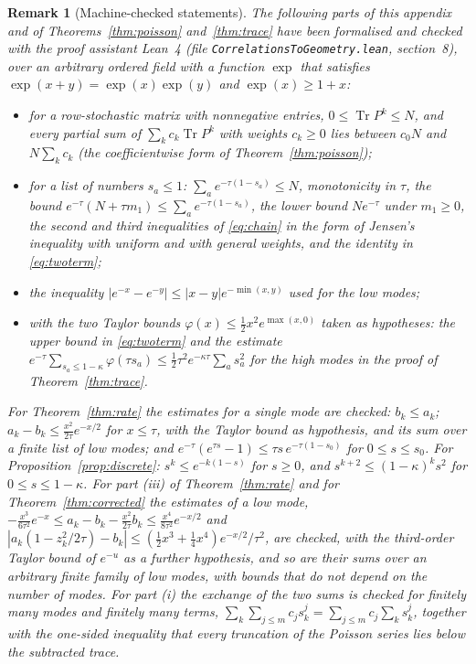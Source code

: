 \documentclass[11pt,a4paper]{article}
\theoremstyle{stmt}
\theoremstyle{defn}
\theoremstyle{rmk}
\newtheorem{remark}[theorem]{Remark}
\numberwithin{equation}{section}
\DeclareMathOperator{\Tr}{Tr}
\begin{document}
{\begin{remark}[Machine-checked statements]\label{rem:lean}
The following parts of this appendix and of Theorems~\ref{thm:poisson} and~\ref{thm:trace} have been formalised and checked with the proof assistant Lean~4 (file \texttt{CorrelationsToGeometry.lean}, section~8), over an arbitrary ordered field with a function $\exp$ that satisfies $\exp(x+y)=\exp(x)\exp(y)$ and $\exp(x)\ge1+x$:
\begin{itemize}
\item for a row-stochastic matrix with nonnegative entries, $0\le\Tr P^k\le N$, and every partial sum of $\sum_kc_k\Tr P^k$ with weights $c_k\ge0$ lies between $c_0N$ and $N\sum_kc_k$ (the coefficientwise form of Theorem~\ref{thm:poisson});
\item for a list of numbers $s_a\le1$: $\sum_ae^{-\tau(1-s_a)}\le N$, monotonicity in $\tau$, the bound $e^{-\tau}(N+\tau m_1)\le\sum_ae^{-\tau(1-s_a)}$, the lower bound $Ne^{-\tau}$ under $m_1\ge0$, the second and third inequalities of \eqref{eq:chain} in the form of Jensen's inequality with uniform and with general weights, and the identity in \eqref{eq:twoterm};
\item the inequality $|e^{-x}-e^{-y}|\le|x-y|e^{-\min(x,y)}$ used for the low modes;
\item with the two Taylor bounds $\varphi(x)\le\tfrac12x^2e^{\max(x,0)}$ taken as hypotheses: the upper bound in \eqref{eq:twoterm} and the estimate $e^{-\tau}\sum_{s_a\le1-\kappa}\varphi(\tau s_a)\le\tfrac12\tau^2e^{-\kappa\tau}\sum_as_a^2$ for the high modes in the proof of Theorem~\ref{thm:trace}.
\end{itemize}
For Theorem~\ref{thm:rate} the estimates for a single mode are checked: $b_k\le a_k$; $a_k-b_k\le\frac{x^2}{2\tau}e^{-x/2}$ for $x\le\tau$, with the Taylor bound as hypothesis, and its sum over a finite list of low modes; and $e^{-\tau}(e^{\tau s}-1)\le\tau s\,e^{-\tau(1-s_0)}$ for $0\le s\le s_0$. For Proposition~\ref{prop:discrete}: $s^k\le e^{-k(1-s)}$ for $s\ge0$, and $s^{k+2}\le(1-\kappa)^ks^2$ for $0\le s\le1-\kappa$. For part (iii) of Theorem~\ref{thm:rate} and for Theorem~\ref{thm:corrected} the estimates of a low mode, $-\tfrac{x^3}{6\tau^2}e^{-x}\le a_k-b_k-\tfrac{x^2}{2\tau}b_k\le\tfrac{x^4}{8\tau^2}e^{-x/2}$ and $|a_k(1-z_k^2/2\tau)-b_k|\le(\tfrac12x^3+\tfrac14x^4)e^{-x/2}/\tau^2$, are checked, with the third-order Taylor bound of $e^{-u}$ as a further hypothesis, and so are their sums over an arbitrary finite family of low modes, with bounds that do not depend on the number of modes. For part (i) the exchange of the two sums is checked for finitely many modes and finitely many terms, $\sum_k\sum_{j\le m}c_js_k^j=\sum_{j\le m}c_j\sum_ks_k^j$, together with the one-sided inequality that every truncation of the Poisson series lies below the subtracted trace.


\end{remark}}
\end{document}
